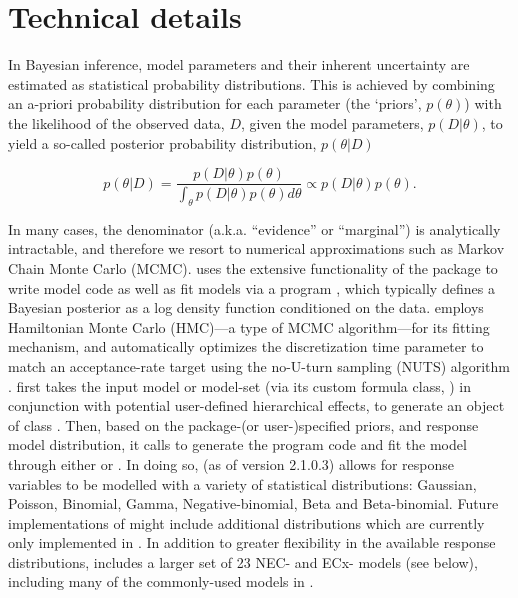 \documentclass[
  shortnames]{jss}
\begin{document}
\hypertarget{technical-details}{%
\section{Technical details}\label{technical-details}}

In Bayesian inference, model parameters and their inherent uncertainty are estimated as statistical probability distributions. This is achieved by combining an a-priori probability distribution for each parameter (the `priors', \(p(\theta)\)) with the likelihood of the observed data, \(D\), given the model parameters, \(p(D | \theta)\), to yield a so-called posterior probability distribution, \(p(\theta | D)\)

\begin{equation}
  p(\theta | D) = \frac{p(D | \theta) p(\theta)}{\int_{\theta} p(D | \theta) p(\theta) d \theta} \propto p(D | \theta) p(\theta).
  \label{eqn1}
\end{equation}

In many cases, the denominator (a.k.a. ``evidence'' or ``marginal'') is analytically intractable, and therefore we resort to numerical approximations such as Markov Chain Monte Carlo (MCMC).  uses the extensive functionality of the  package to write model code as well as fit models via a  program \citep{stan2021}, which typically defines a Bayesian posterior as a log density function conditioned on the data.  employs Hamiltonian Monte Carlo (HMC)---a type of MCMC algorithm---for its fitting mechanism, and automatically optimizes the discretization time parameter to match an acceptance-rate target using the no-U-turn sampling (NUTS) algorithm \citep{hoffman2014}.  first takes the input model or model-set (via its custom formula class, ) in conjunction with potential user-defined hierarchical effects, to generate an object of class . Then, based on the package-(or user-)specified priors, and response model distribution, it calls  \citep{Burkner2017, Burkner2018} to generate the  program code and fit the model through either  \citep{rstan2021} or \citep{cmdstanr2022}. In doing so,  (as of version 2.1.0.3) allows for response variables to be modelled with a variety of statistical distributions: Gaussian, Poisson, Binomial, Gamma, Negative-binomial, Beta and Beta-binomial. Future implementations of  might include additional distributions which are currently only implemented in . In addition to greater flexibility in the available response distributions,  includes a larger set of 23 NEC- and ECx- models (see below), including many of the commonly-used models in  \citep{Ritz2016}.
\end{document}
